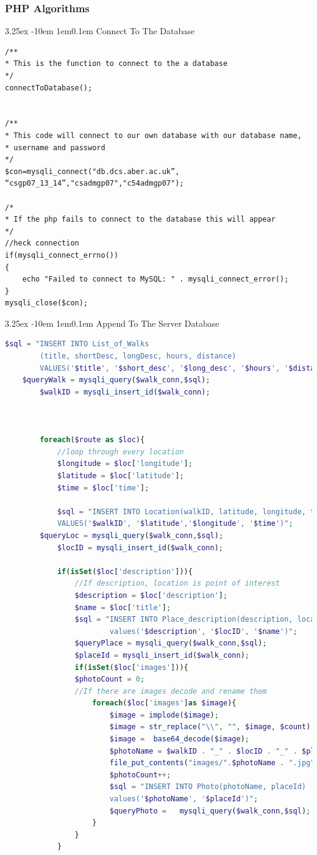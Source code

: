 \documentclass[12pt]{article}
\makeatletter
\renewcommand{\paragraph}{
  \@startsection{paragraph}{4}
  {\z@}{3.25ex \@plus -10em \@minus 1em}{0.1em}
  {\normalfont\normalsize\bfseries}
}
\newcommand{\zeroindent}{\setlength{\parindent}{0pt}}
\makeatother
\begin{document}
\subsubsection{PHP Algorithms}
\paragraph{Connect To The Database}
\zeroindent
\begin{lstlisting}
/**
* This is the function to connect to the a database
*/ 
connectToDatabase();


/**
* This code will connect to our own database with our database name,
* username and password
*/  
$con=mysqli_connect("db.dcs.aber.ac.uk”, “csgp07_13_14”,"csadmgp07","c54admgp07");

/*
* If the php fails to connect to the database this will appear
*/
//heck connection
if(mysqli_connect_errno())
{
	echo "Failed to connect to MySQL: " . mysqli_connect_error();
}
mysqli_close($con);
\end{lstlisting}
\paragraph{Append To The Server Database}
\begin{lstlisting}[language = php]
$sql = "INSERT INTO List_of_Walks
		(title, shortDesc, longDesc, hours, distance)
		VALUES('$title', '$short_desc', '$long_desc', '$hours', '$distance')"; 
	$queryWalk = mysqli_query($walk_conn,$sql);
		$walkID = mysqli_insert_id($walk_conn);

	

		foreach($route as $loc){
			//loop through every location
			$longitude = $loc['longitude'];
			$latitude = $loc['latitude'];
			$time = $loc['time'];
			
			$sql = "INSERT INTO Location(walkID, latitude, longitude, timestamp)	
			VALUES('$walkID', '$latitude','$longitude', '$time')";
		$queryLoc =	mysqli_query($walk_conn,$sql);
			$locID = mysqli_insert_id($walk_conn);
			
			if(isSet($loc['description'])){
				//If description, location is point of interest
				$description = $loc['description'];
				$name = $loc['title'];
				$sql = "INSERT INTO Place_description(description, locationId, name)
						values('$description', '$locID', '$name')";
				$queryPlace = mysqli_query($walk_conn,$sql);
				$placeId = mysqli_insert_id($walk_conn);
				if(isSet($loc['images'])){
				$photoCount = 0;
				//If there are images decode and rename them
					foreach($loc['images']as $image){
						$image = implode($image);
						$image = str_replace("\\", "", $image, $count);
						$image =  base64_decode($image);
						$photoName = $walkID . "_" . $locID . "_" . $placeId . "_" . $photoCount;
						file_put_contents("images/".$photoName . ".jpg",$image);
						$photoCount++;
						$sql = "INSERT INTO Photo(photoName, placeId)
						values('$photoName', '$placeId')";
						$queryPhoto =	mysqli_query($walk_conn,$sql);
					}
				}
			}
\end{lstlisting}
\end{document}

